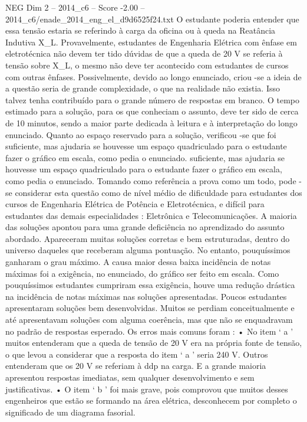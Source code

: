 \begin{textsample}{NEG Dim 2 – 2014\_c6 – Score -2.00 – 2014\_c6/enade\_2014\_eng\_el\_d9d6525f24.txt}
O estudante poderia entender que essa tensão estaria se referindo à carga da oficina ou à queda na Reatância Indutiva X\_L.
Provavelmente, estudantes de Engenharia Elétrica com ênfase em eletrotécnica não devem ter tido dúvidas de que a queda de 20 V se referia à tensão sobre X\_L, o mesmo não deve ter acontecido com estudantes de cursos com outras ênfases.
Possivelmente, devido ao longo enunciado, criou -se a ideia de a questão seria de grande complexidade, o que na realidade não existia.
Isso talvez tenha contribuído para o grande número de respostas em branco.
O tempo estimado para a solução, para os que conheciam o assunto, deve ter sido de cerca de 10 minutos, sendo a maior parte dedicada à leitura e à interpretação do longo enunciado.
Quanto ao espaço reservado para a solução, verificou -se que foi suficiente, mas ajudaria se houvesse um espaço quadriculado para o estudante fazer o gráfico em escala, como pedia o enunciado. suficiente, mas ajudaria se houvesse um espaço quadriculado para o estudante fazer o gráfico em escala, como pedia o enunciado.
Tomando como referência a prova como um todo, pode -se considerar esta questão como de nível médio de dificuldade para estudantes dos cursos de Engenharia Elétrica de Potência e Eletrotécnica, e difícil para estudantes das demais especialidades : Eletrônica e Telecomunicações.
A maioria das soluções apontou para uma grande deficiência no aprendizado do assunto abordado.
Apareceram muitas soluções corretas e bem estruturadas, dentro do universo daqueles que receberam alguma pontuação.
No entanto, pouquíssimos ganharam o grau máximo.
A causa maior dessa baixa incidência de notas máximas foi a exigência, no enunciado, do gráfico ser feito em escala.
Como pouquíssimos estudantes cumpriram essa exigência, houve uma redução drástica na incidência de notas máximas nas soluções apresentadas.
Poucos estudantes apresentaram soluções bem desenvolvidas.
Muitos se perdiam conceitualmente e até apresentavam soluções com alguma coerência, mas que não se enquadravam no padrão de respostas esperado.
Os erros mais comuns foram : • No item ‘ a ’ muitos entenderam que a queda de tensão de 20 V era na própria fonte de tensão, o que levou a considerar que a resposta do item ‘ a ’ seria 240 V.
Outros entenderam que os 20 V se referiam à ddp na carga.
E a grande maioria apresentou respostas imediatas, sem qualquer desenvolvimento e sem justificativas. • O item ‘ b ’ foi mais grave, pois comprovou que muitos desses engenheiros que estão se formando na área elétrica, desconhecem por completo o significado de um diagrama fasorial.

\end{textsample}
